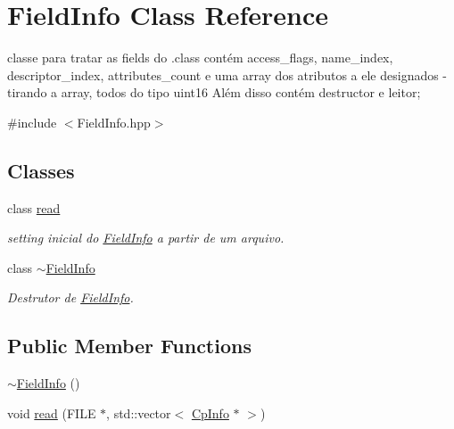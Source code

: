 \hypertarget{class_field_info}{}\section{Field\+Info Class Reference}
\label{class_field_info}


classe para tratar as fields do .class contém access\+\_\+flags, name\+\_\+index, descriptor\+\_\+index, attributes\+\_\+count e uma array dos atributos a ele designados -\/ tirando a array, todos do tipo uint16 Além disso contém destructor e leitor;  




{\ttfamily \#include $<$Field\+Info.\+hpp$>$}

\subsection*{Classes}
\begin{DoxyCompactItemize}
\item 
class \hyperlink{class_field_info_1_1read}{read}
\begin{DoxyCompactList}\small\item\em setting inicial do \hyperlink{class_field_info}{Field\+Info} a partir de um arquivo. \end{DoxyCompactList}\item 
class \hyperlink{class_field_info_1_1~_field_info}{$\sim$\+Field\+Info}
\begin{DoxyCompactList}\small\item\em Destrutor de \hyperlink{class_field_info}{Field\+Info}. \end{DoxyCompactList}\end{DoxyCompactItemize}
\subsection*{Public Member Functions}
\begin{DoxyCompactItemize}
\item 
\hyperlink{class_field_info_ae59d956e2a4ad2dc210d75f161d5eb31}{$\sim$\+Field\+Info} ()
\item 
void \hyperlink{class_field_info_acb85db9ce893bc3e2617138fd46a8ad6}{read} (F\+I\+LE $\ast$, std\+::vector$<$ \hyperlink{class_cp_info}{Cp\+Info} $\ast$ $>$)
\end{DoxyCompactItemize}
